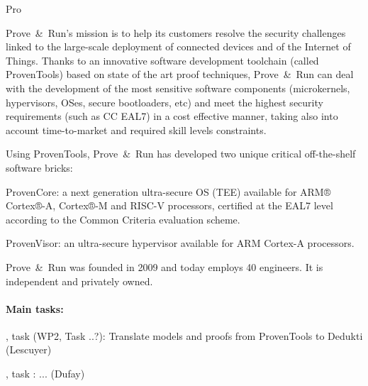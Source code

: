\begin{sitedescription}{Pro}
\newcommand{\provenrun}[0]{Prove\ \&\ Run}



\provenrun's mission is to help its customers resolve the security
challenges linked to the large-scale deployment of connected devices
and of the Internet of Things. Thanks to an innovative software
development toolchain (called ProvenTools) based on state of the art
proof techniques, \provenrun{} can deal with the development of the
most sensitive software components (microkernels, hypervisors, OSes,
secure bootloaders, etc) and meet the highest security requirements
(such as CC EAL7) in a cost effective manner, taking also into account
time-to-market and required skill levels constraints.

Using ProvenTools, \provenrun{} has developed two unique critical
off-the-shelf software bricks:
\begin{compactitem}
\item ProvenCore: a next generation ultra-secure OS (TEE) available
  for ARM® Cortex®-A, Cortex®-M and RISC-V processors, certified at
  the EAL7 level according to the Common Criteria evaluation scheme.
\item ProvenVisor: an ultra-secure hypervisor available for ARM
  Cortex-A processors.
\end{compactitem}

\provenrun{} was founded in 2009 and today employs 40 engineers. It is
independent and privately owned.

\paragraph{Main tasks:}



\begin{compactitem}
\item {}, task  (WP2, Task ..?): Translate models and proofs from ProvenTools to Dedukti (Lescuyer)
\item {}, task : ... (Dufay)
\end{compactitem}


\end{sitedescription}
